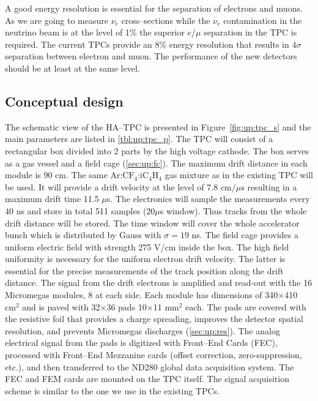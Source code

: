 \documentclass[../main.tex]{subfiles}
\begin{document}
A good energy resolution is essential for the separation of electrons and muons. As we are going to measure $\nu_e$ cross--sections while the $\nu_e$ contamination in the neutrino beam is at the level of 1\% the superior $e/\mu$ separation in the TPC is required. The current TPCs provide an 8\% energy resolution that results in 4$\sigma$ separation between electron and muon. The performance of the new detectors should be at least at the same level.

\subsection{Conceptual design}
The schematic view of the HA--TPC is presented in Figure~\ref{fig:up:tpc_s} and the main parameters are listed in \autoref{tbl:up:tpc_p}. The TPC will consist of a rectangular box divided into 2 parts by the high voltage cathode. The box serves as a gas vessel and a field cage (\autoref{sec:up:fc}). The maximum drift distance in each module is 90 cm. The same $\text{Ar:CF}_4\text{:iC}_4\text{H}_4$ gas mixture as in the existing TPC will be used. It will provide a drift velocity at the level of 7.8 $\text{cm/}\mu\text{s}$ resulting in a maximum drift time 11.5 $\mu$s. The electronics will sample the measurements every 40 ns and store in total 511 samples (20$\mu$s window). Thus tracks from the whole drift distance will be stored. The time window will cover the whole accelerator bunch which is distributed by Gauss with $\sigma=19$ ns. The field cage provides a uniform electric field with strength 275 V/cm inside the box. The high field uniformity is necessary for the uniform electron drift velocity. The latter is essential for the precise measurements of the track position along the drift distance. The signal from the drift electrons is amplified and read-out with the 16 Micromegas modules, 8 at each side. Each module has dimensions of 340$\times$410 $\text{cm}^2$ and is paved with 32$\times$36 pads 10$\times$11 $\text{mm}^2$ each. The pads are covered with the resistive foil that provides a charge spreading, improves the detector spatial resolution, and prevents Micromegas discharges (\autoref{sec:up:res}). The analog electrical signal from the pads is digitized with Front--End Cards (FEC), processed with Front--End Mezzanine cards (offset correction, zero-suppression, etc.), and then transferred to the ND280 global data acquisition system. The FEC and FEM cards are mounted on the TPC itself. The signal acquisition scheme is similar to the one we use in the existing TPCs.
\end{document}
